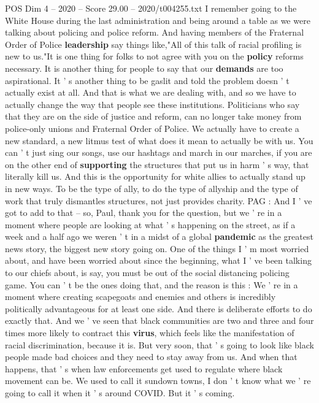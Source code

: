 \begin{textsample}{POS Dim 4 – 2020 – Score 29.00 – 2020/t004255.txt}
I remember going to the White House during the last administration and being around a table as we were talking about policing and police reform.
And having members of the Fraternal Order of Police \textbf{leadership} say things like,"All of this talk of racial profiling is new to us."It is one thing for folks to not agree with you on the \textbf{policy} reforms necessary.
It is another thing for people to say that our \textbf{demands} are too aspirational.
It ' s another thing to be gaslit and told the problem doesn ' t actually exist at all.
And that is what we are dealing with, and so we have to actually change the way that people see these institutions.
Politicians who say that they are on the side of justice and reform, can no longer take money from police-only unions and Fraternal Order of Police.
We actually have to create a new standard, a new litmus test of what does it mean to actually be with us.
You can ' t just sing our songs, use our hashtags and march in our marches, if you are on the other end of \textbf{supporting} the structures that put us in harm ' s way, that literally kill us.
And this is the opportunity for white allies to actually stand up in new ways.
To be the type of ally, to do the type of allyship and the type of work that truly dismantles structures, not just provides charity.
PAG : And I ' ve got to add to that -- so, Paul, thank you for the question, but we ' re in a moment where people are looking at what ' s happening on the street, as if a week and a half ago we weren ' t in a midst of a global \textbf{pandemic} as the greatest news story, the biggest new story going on.
One of the things I ' m most worried about, and have been worried about since the beginning, what I ' ve been talking to our chiefs about, is say, you must be out of the social distancing policing game.
You can ' t be the ones doing that, and the reason is this : We ' re in a moment where creating scapegoats and enemies and others is incredibly politically advantageous for at least one side.
And there is deliberate efforts to do exactly that.
And we ' ve seen that black communities are two and three and four times more likely to contract this \textbf{virus}, which feels like the manifestation of racial discrimination, because it is.
But very soon, that ' s going to look like black people made bad choices and they need to stay away from us.
And when that happens, that ' s when law enforcements get used to regulate where black movement can be.
We used to call it sundown towns, I don ' t know what we ' re going to call it when it ' s around COVID.
But it ' s coming.

\end{textsample}
